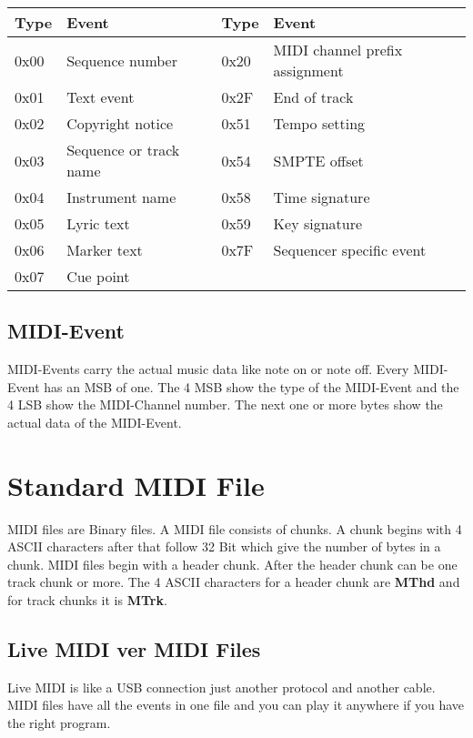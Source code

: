 \begin{tabular}{|l|l|l|l|}
    \hline
        Type & Event & Type & Event \\ \hline
        0x00 & Sequence number & 0x20 & MIDI channel prefix assignment \\ \hline
        0x01 & Text event & 0x2F & End of track \\ \hline
        0x02 & Copyright notice & 0x51 & Tempo setting \\ \hline
        0x03 & Sequence or track name & 0x54 & SMPTE offset \\ \hline
        0x04 & Instrument name & 0x58 & Time signature \\ \hline
        0x05 & Lyric text & 0x59 & Key signature \\ \hline
        0x06 & Marker text & 0x7F & Sequencer specific event \\ \hline
        0x07 & Cue point & ~ & ~ \\ \hline
    \end{tabular}


\subsection{MIDI-Event}

MIDI-Events carry the actual music data like note on or note off. Every MIDI-Event has an MSB of one. The 4 MSB show the type of the MIDI-Event and the 4 LSB show the MIDI-Channel number. The next one or more bytes show the actual data of the MIDI-Event.

\section{Standard MIDI File}

MIDI files are Binary files. A MIDI file consists of chunks. A chunk begins with 4 ASCII characters after that follow 32 Bit which give the number of bytes in a chunk. MIDI files begin with a header chunk. After the header chunk can be one track chunk or more. The 4 ASCII characters for a header chunk are \textbf{MThd} and for track chunks it is \textbf{MTrk}.

\subsection{Live MIDI ver MIDI Files}

Live MIDI is like a USB connection just another protocol and another cable. MIDI files have all the events in one file and you can play it anywhere if you have the right program.

